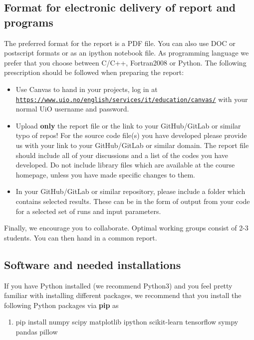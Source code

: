 \documentclass[%
oneside,                 %
final,                   %
10pt]{article}
\begin{document}
\noindent
\subsection{Format for electronic delivery of report and programs}

The preferred format for the report is a PDF file. You can also use DOC or postscript formats or as an ipython notebook file.  As programming language we prefer that you choose between C/C++, Fortran2008 or Python. The following prescription should be followed when preparing the report:

\begin{itemize}
  \item Use Canvas to hand in your projects, log in  at  \href{{https://www.uio.no/english/services/it/education/canvas/}}{\nolinkurl{https://www.uio.no/english/services/it/education/canvas/}} with your normal UiO username and password.

  \item Upload \textbf{only} the report file or the link to your GitHub/GitLab or similar typo of  repos!  For the source code file(s) you have developed please provide us with your link to your GitHub/GitLab or similar  domain.  The report file should include all of your discussions and a list of the codes you have developed.  Do not include library files which are available at the course homepage, unless you have made specific changes to them.

  \item In your GitHub/GitLab or similar repository, please include a folder which contains selected results. These can be in the form of output from your code for a selected set of runs and input parameters.
\end{itemize}

\noindent
Finally, 
we encourage you to collaborate. Optimal working groups consist of 
2-3 students. You can then hand in a common report. 

\subsection{Software and needed installations}

If you have Python installed (we recommend Python3) and you feel pretty familiar with installing different packages, 
we recommend that you install the following Python packages via \textbf{pip} as
\begin{enumerate}
\item pip install numpy scipy matplotlib ipython scikit-learn tensorflow sympy pandas pillow
\end{enumerate}
\end{document}
